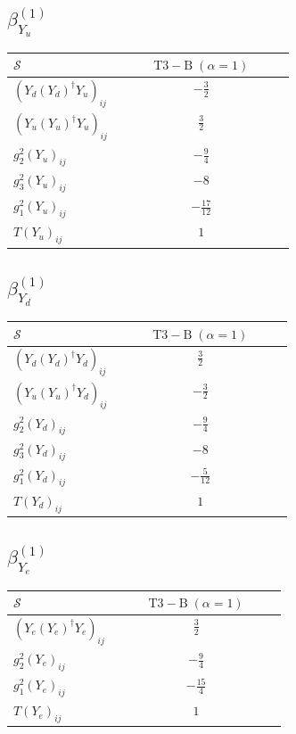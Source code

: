 \documentclass[9pt]{article}
\begin{document}
\subsection*{$ \beta_{Y_u}^{(1)} $}
\begin{longtable}{@{}p{0.38\linewidth}c@{}}
\toprule
$\mathcal{S}$ & $ \mathrm{T3-B}\;(\alpha=1) $ \\
\midrule
$ (Y_d (Y_d)^{\dagger} Y_u)_{ij} $ & $ - \frac{3}{2} $ \\
$ (Y_u (Y_u)^{\dagger} Y_u)_{ij} $ & $ \frac{3}{2} $ \\
$ g_2^2 (Y_u)_{ij} $ & $ - \frac{9}{4} $ \\
$ g_3^2 (Y_u)_{ij} $ & $ -8 $ \\
$ g_1^2 (Y_u)_{ij} $ & $ - \frac{17}{12} $ \\
$ T (Y_u)_{ij} $ & $ 1 $ \\
\bottomrule
\end{longtable}
\subsection*{$ \beta_{Y_d}^{(1)} $}
\begin{longtable}{@{}p{0.38\linewidth}c@{}}
\toprule
$\mathcal{S}$ & $ \mathrm{T3-B}\;(\alpha=1) $ \\
\midrule
$ (Y_d (Y_d)^{\dagger} Y_d)_{ij} $ & $ \frac{3}{2} $ \\
$ (Y_u (Y_u)^{\dagger} Y_d)_{ij} $ & $ - \frac{3}{2} $ \\
$ g_2^2 (Y_d)_{ij} $ & $ - \frac{9}{4} $ \\
$ g_3^2 (Y_d)_{ij} $ & $ -8 $ \\
$ g_1^2 (Y_d)_{ij} $ & $ - \frac{5}{12} $ \\
$ T (Y_d)_{ij} $ & $ 1 $ \\
\bottomrule
\end{longtable}
\subsection*{$ \beta_{Y_e}^{(1)} $}
\begin{longtable}{@{}p{0.38\linewidth}c@{}}
\toprule
$\mathcal{S}$ & $ \mathrm{T3-B}\;(\alpha=1) $ \\
\midrule
$ (Y_e (Y_e)^{\dagger} Y_e)_{ij} $ & $ \frac{3}{2} $ \\
$ g_2^2 (Y_e)_{ij} $ & $ - \frac{9}{4} $ \\
$ g_1^2 (Y_e)_{ij} $ & $ - \frac{15}{4} $ \\
$ T (Y_e)_{ij} $ & $ 1 $ \\
\bottomrule
\end{longtable}
\end{document}
